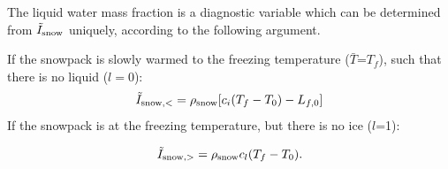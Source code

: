 \documentclass[twoside,10pt]{report}
\begin{document}
 The liquid water mass fraction is a diagnostic variable which can be determined from $\tilde{I}_{\rm snow}$ uniquely, according to the following argument. 
 
If the snowpack is slowly warmed to the freezing temperature ($\bar{T}$=$T_f$), such that there is no liquid ($l=0$):
\begin{equation}
\tilde{I}_{\rm snow,<} = \rho_{\rm snow}[c_i  (T_{f} - T_0) -L_{f,0}] 
\end{equation}
If the snowpack is at the freezing temperature, but there is no ice ($l$=1): %

\begin{equation}
\tilde{I}_{\rm snow,>} = \rho_{\rm snow}c_l(T_f-T_0).
\end{equation}
\end{document}
